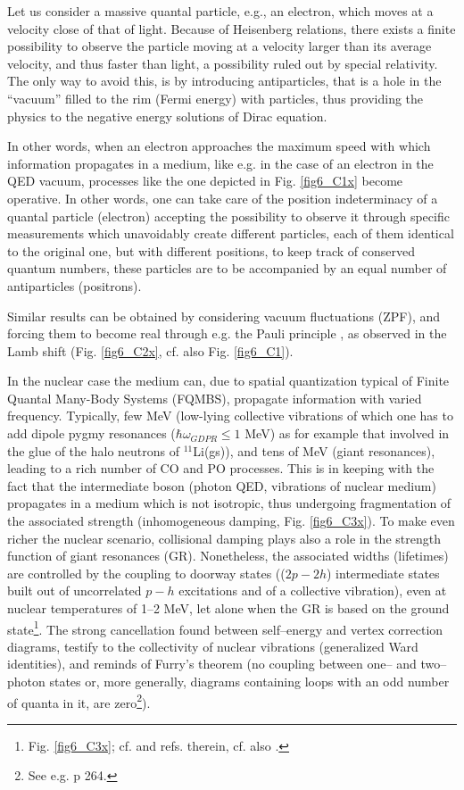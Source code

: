Let us consider a massive quantal particle, e.g., an electron, which moves at a velocity close of that of light. Because of Heisenberg relations, there exists a finite possibility to observe the particle moving at a velocity larger than its average velocity, and thus faster than light, a possibility ruled out by special relativity. The only way to avoid this, is by introducing antiparticles, that is a hole in the ``vacuum'' filled to the rim (Fermi energy) with particles, thus providing the physics to the negative energy solutions of Dirac equation.

In other words, when an electron approaches the maximum speed with which information propagates in a medium, like e.g. in the case of an electron in the QED vacuum, processes like the one depicted in Fig. \ref{fig6_C1x} become operative. In other words, one can take care of the position indeterminacy of a quantal particle (electron) accepting the possibility to observe it through specific measurements which unavoidably create different particles, each of them identical to the original one, but with different positions, to keep track of conserved quantum numbers, these particles are to be accompanied by an equal number of antiparticles (positrons).

Similar results can be obtained by considering vacuum fluctuations (ZPF), and forcing them to become real through e.g. the Pauli principle \citep{Pauli:47}, as observed in the Lamb shift (Fig. \ref{fig6_C2x}, cf. also Fig. \ref{fig6_C1}).


In the nuclear case the medium can, due to spatial quantization typical of Finite Quantal Many-Body Systems (FQMBS), propagate information with varied frequency. Typically, few MeV (low-lying collective vibrations of  which one has to add dipole pygmy resonances ($\hbar\omega_{GDPR}\leq 1$ MeV) as for example that involved in the glue of the halo neutrons of $^{11}$Li(gs)), and tens of MeV (giant resonances), leading to a rich number of CO and PO processes. This is in keeping with the fact that the intermediate boson (photon QED, vibrations of nuclear medium) propagates in a medium which is not isotropic, thus undergoing fragmentation of the associated strength (inhomogeneous damping, Fig. \ref{fig6_C3x}). To make even richer the nuclear scenario, collisional damping plays also a role in the strength function of giant resonances (GR). Nonetheless, the associated widths (lifetimes) are controlled by the coupling to doorway states (($2p-2h$) intermediate states built out of uncorrelated $p-h$ excitations and of a collective vibration), even at nuclear temperatures of 1--2 MeV, let alone when the GR is based on the ground state\footnote{Fig. \ref{fig6_C3x}; cf. \cite{Bortignon:98} and refs. therein, cf. also \cite{Broglia:87}.}. The strong cancellation found between self--energy and vertex correction diagrams, testify to the collectivity of nuclear vibrations (generalized Ward identities), and reminds of Furry's theorem (no coupling between one-- and two--photon states or, more generally, diagrams containing loops with an odd number of quanta in it, are zero\footnote{See e.g. \cite{Mehra:96} p 264.}).


